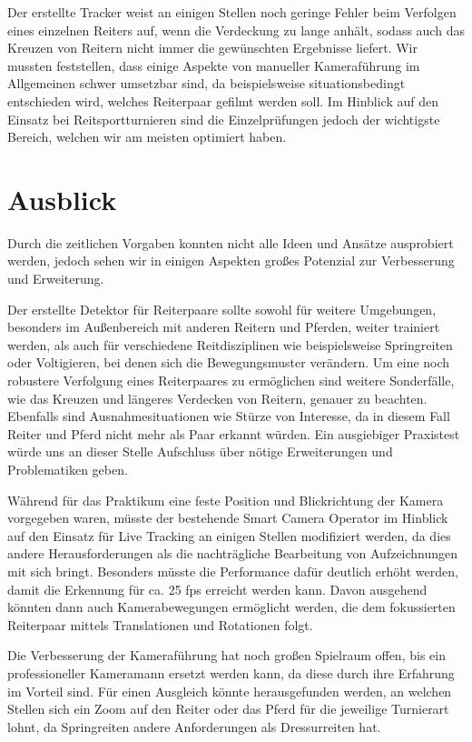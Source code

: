 Der erstellte Tracker weist an einigen Stellen noch geringe Fehler beim Verfolgen eines einzelnen Reiters auf, wenn die Verdeckung zu lange anhält, sodass auch das Kreuzen von Reitern nicht immer die gewünschten Ergebnisse liefert. 
Wir mussten feststellen, dass einige Aspekte von manueller Kameraführung im Allgemeinen schwer umsetzbar sind, da beispielsweise situationsbedingt entschieden wird, welches Reiterpaar gefilmt werden soll. 
Im Hinblick auf den Einsatz bei Reitsportturnieren sind die Einzelprüfungen jedoch der wichtigste Bereich, welchen wir am meisten optimiert haben.


\section{Ausblick}
Durch die zeitlichen Vorgaben konnten nicht alle Ideen und Ansätze ausprobiert werden, jedoch sehen wir in einigen Aspekten großes Potenzial zur Verbesserung und Erweiterung.

Der erstellte Detektor für Reiterpaare sollte sowohl für weitere Umgebungen, besonders im Außenbereich mit anderen Reitern und Pferden, weiter trainiert werden, als auch für verschiedene Reitdisziplinen wie beispielsweise Springreiten oder Voltigieren, bei denen sich die Bewegungsmuster verändern. 
Um eine noch robustere Verfolgung eines Reiterpaares zu ermöglichen sind weitere Sonderfälle, wie das Kreuzen und längeres Verdecken von Reitern, genauer zu beachten. Ebenfalls sind Ausnahmesituationen wie Stürze von Interesse, da in diesem Fall Reiter und Pferd nicht mehr als Paar erkannt würden.
Ein ausgiebiger Praxistest würde uns an dieser Stelle Aufschluss über nötige Erweiterungen und Problematiken geben.

Während für das Praktikum eine feste Position und Blickrichtung der Kamera vorgegeben waren, müsste der bestehende Smart Camera Operator im Hinblick auf den Einsatz für Live Tracking an einigen Stellen modifiziert werden, da dies andere Herausforderungen als die nachträgliche Bearbeitung von Aufzeichnungen mit sich bringt. Besonders müsste die Performance dafür deutlich erhöht werden, damit die Erkennung für ca. 25 fps erreicht werden kann. Davon ausgehend könnten dann auch Kamerabewegungen ermöglicht werden, die dem fokussierten Reiterpaar mittels Translationen und Rotationen folgt.

Die Verbesserung der Kameraführung hat noch großen Spielraum offen, bis ein professioneller Kameramann ersetzt werden kann, da diese durch ihre Erfahrung im Vorteil sind. Für einen Ausgleich könnte herausgefunden werden, an welchen Stellen sich ein Zoom auf den Reiter oder das Pferd für die jeweilige Turnierart lohnt, da Springreiten andere Anforderungen als Dressurreiten hat.

